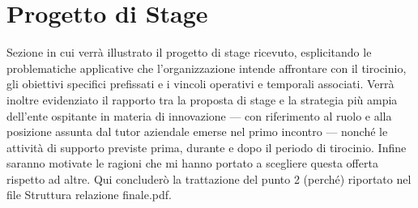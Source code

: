 \section{Progetto di Stage}

Sezione in cui verrà illustrato il progetto di stage ricevuto, esplicitando le problematiche applicative che l'organizzazione intende affrontare con il tirocinio, gli obiettivi specifici prefissati e i vincoli operativi e temporali associati. Verrà inoltre evidenziato il rapporto tra la proposta di stage e la strategia più ampia dell'ente ospitante in materia di innovazione — con riferimento al ruolo e alla posizione assunta dal tutor aziendale emerse nel primo incontro — nonché le attività di supporto previste prima, durante e dopo il periodo di tirocinio. Infine saranno motivate le ragioni che mi hanno portato a scegliere questa offerta rispetto ad altre.  
Qui concluderò la trattazione del punto 2 (perché) riportato nel file Struttura relazione finale.pdf.



